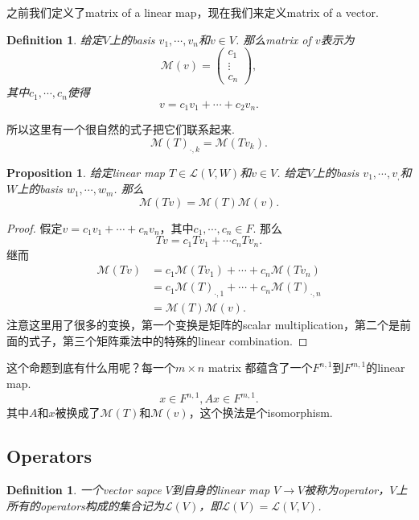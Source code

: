 \documentclass{article}
\newtheorem{proposition}[theorem]{Proposition}
\newtheorem{definition}[theorem]{Definition}
\begin{document}
之前我们定义了matrix of a linear map，现在我们来定义matrix of a vector.

\begin{definition}
给定$V$上的basis $v_1,\cdots,v_n$和$v \in V$. 那么matrix of $v$表示为
$$
\mathcal{M}(v)=
\begin{pmatrix}
c_1 \\
\vdots\\
c_n
\end{pmatrix},
$$ 
其中$c_1,\cdots,c_n$使得
$$
v = c_1v_1 + \cdots + c_2v_n.
$$
\end{definition} 

{\color{red} 所以这里有一个很自然的式子把它们联系起来}.
$$
\mathcal{M}(T)_{\cdot,k}=\mathcal{M}(Tv_k).
$$

\begin{proposition}
\rm 给定linear map $T \in \mathcal{L}(V,W)$和$v \in V$. 给定$V$上的basis $v_1,\cdots,v_,$和$W$上的basis $w_1,\cdots,w_m$. 那么
$$
\mathcal{M}(Tv) =  \mathcal{M}(T)\mathcal{M}(v).
$$
\end{proposition}

\begin{proof}
假定$v=c_1v_1 + \cdots + c_nv_n$，其中$c_1,\cdots,c_n \in F$. 那么
$$
Tv =  c_1Tv_1 + \cdots c_nTv_n.
$$
继而
$$
\begin{aligned}
\mathcal{M}(Tv) &= c_1\mathcal{M}(Tv_1) + \cdots +c_n \mathcal{M}(Tv_n) \\
				&= c_1\mathcal{M}(T)_{\cdot,1} + \cdots + c_n \mathcal{M}(T)_{\cdot,n} \\
				&= \mathcal{M}(T)\mathcal{M}(v).
\end{aligned} 
$$
注意这里用了很多的变换，第一个变换是矩阵的scalar multiplication，第二个是前面的式子，第三个矩阵乘法中的特殊的linear combination.
\end{proof}

这个命题到底有什么用呢？{\color{blue}每一个$m \times n$ matrix 都蕴含了一个$F^{n,1}$到$F^{m,1}$的linear map}.
$$
x \in F^{n,1} , Ax \in F^{m,1}.
$$
其中$A$和$x$被换成了$\mathcal{M}(T)$和$\mathcal{M}(v)$，这个换法是个isomorphism.

\newpage
\subsection{Operators}

\begin{definition}
\rm 一个vector sapce $V$到自身的linear map $V \rightarrow V$被称为operator，$V$上所有的operators构成的集合记为$\mathcal{L}(V)$，即$\mathcal{L}(V)=\mathcal{L}(V,V)$.
\end{definition}
\end{document}
